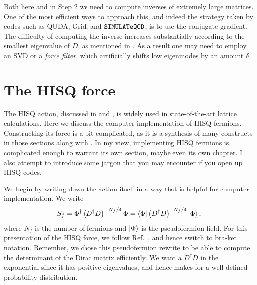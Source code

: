 Both here and in Step 2 we need to compute inverses of extremely
large matrices. One of the most efficient ways to approach this,
and indeed the strategy taken by codes such as 
QUDA, 
Grid, and
$\texttt{SIMULATeQCD}$, is to use the conjugate gradient.
The difficulty of computing the inverse increases
substantially according to the smallest eigenvalue of $D$,
as mentioned in . As a result
one may need to employ an SVD or a
{\it force filter}, which artificially
shifts low eigenmodes by an amount $\delta$.

\section{The HISQ force}\label{sec:HISQforce}

The HISQ action, discussed in  and ,
is widely used in state-of-the-art lattice calculations. 
Here we discuss the computer implementation of HISQ fermions. 
Constructing its
force is a bit complicated, as it is a synthesis of many constructs in
those sections along with . In my view,
implementing HISQ fermions is complicated enough to warrant its own section,
maybe even its own chapter. I also attempt to introduce some jargon that you may
encounter if you open up HISQ codes.

We begin by writing down the action itself in a way that is helpful
for computer implementation. We write
\begin{equation}
S_f=\Phi^\dagger\left(D^\dagger D\right)^{-N_f/4}\Phi
=\bra{\Phi}\left(D^{\dagger} D\right)^{-N_f/4}\ket{\Phi},
\end{equation}
where $N_f$ is the number of fermions and $\ket\Phi$ is the pseudofermion field.
For this presentation of the HISQ force, we follow
Ref.~\cite{Wong:2007uz}, and hence switch to bra-ket notation.
Remember, we chose this pseudofermion rewrite to be able to compute the
determinant of the Dirac matrix efficiently. We want a
$D^\dagger D$ in the exponential since it has positive eigenvalues,
and hence makes for a well defined probability distribution.

